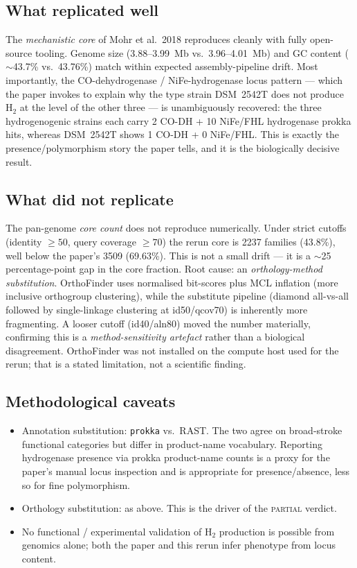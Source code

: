 \documentclass[11pt]{article}
\begin{document}
\subsection*{What replicated well}
The \emph{mechanistic core} of Mohr et al.\ 2018 reproduces cleanly with fully
open-source tooling. Genome size (3.88--3.99~Mb vs.\ 3.96--4.01~Mb) and GC
content ($\sim$43.7\% vs.\ 43.76\%) match within expected assembly-pipeline drift.
Most importantly, the CO-dehydrogenase / NiFe-hydrogenase locus pattern
--- which the paper invokes to explain why the type strain DSM~2542T does not
produce H$_2$ at the level of the other three --- is unambiguously recovered:
the three hydrogenogenic strains each carry 2 CO-DH + 10 NiFe/FHL hydrogenase
prokka hits, whereas DSM~2542T shows 1 CO-DH + 0 NiFe/FHL. This is exactly
the presence/polymorphism story the paper tells, and it is the biologically
decisive result.

\subsection*{What did not replicate}
The pan-genome \emph{core count} does not reproduce numerically. Under
strict cutoffs (identity $\geq 50$, query coverage $\geq 70$) the rerun
core is 2237 families (43.8\%), well below the paper's 3509 (69.63\%). This
is not a small drift --- it is a $\sim$25 percentage-point gap in the core
fraction. Root cause: an \emph{orthology-method substitution}. OrthoFinder
uses normalised bit-scores plus MCL inflation (more inclusive orthogroup
clustering), while the substitute pipeline (diamond all-vs-all followed by
single-linkage clustering at id50/qcov70) is inherently more fragmenting.
A looser cutoff (id40/aln80) moved the number materially, confirming this
is a \emph{method-sensitivity artefact} rather than a biological disagreement.
OrthoFinder was not installed on the compute host used for the rerun; that
is a stated limitation, not a scientific finding.

\subsection*{Methodological caveats}
\begin{itemize}
  \item Annotation substitution: \texttt{prokka} vs.\ RAST. The two agree on
        broad-stroke functional categories but differ in product-name
        vocabulary. Reporting hydrogenase presence via prokka product-name
        counts is a proxy for the paper's manual locus inspection and is
        appropriate for presence/absence, less so for fine polymorphism.
  \item Orthology substitution: as above. This is the driver of the
        \textsc{partial} verdict.
  \item No functional / experimental validation of H$_2$ production is
        possible from genomics alone; both the paper and this rerun infer
        phenotype from locus content.
\end{itemize}
\end{document}
